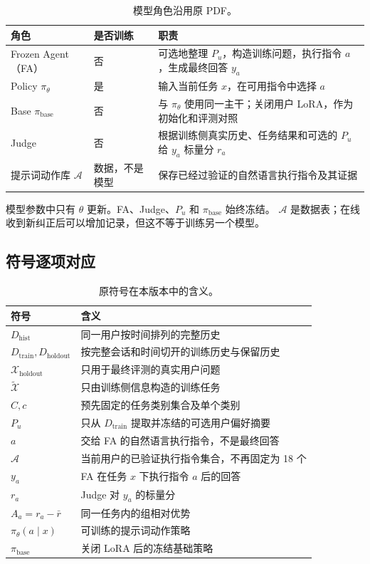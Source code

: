 \documentclass[11pt,UTF8,fontset=fandol]{ctexart}
\newcommand{\Dhist}{D_{\mathrm{hist}}}
\newcommand{\Dtrain}{D_{\mathrm{train}}}
\newcommand{\Dholdout}{D_{\mathrm{holdout}}}
\newcommand{\Xholdout}{\mathcal X_{\mathrm{holdout}}}
\newcommand{\Xsim}{\widetilde{\mathcal X}}
\newcommand{\policy}{\pi_{\theta}}
\newcommand{\basepolicy}{\pi_{\mathrm{base}}}
\begin{document}
\begin{table}[ht]
  \centering
  \caption{模型角色沿用原 PDF。}
  \begin{tabularx}{\textwidth}{@{}L{0.22\textwidth}L{0.14\textwidth}Y@{}}
    \toprule
    角色 & 是否训练 & 职责 \\
    \midrule
    Frozen Agent（FA） &
    否 &
    可选地整理 \(P_u\)，构造训练问题，执行指令 \(a\)，生成最终回答 \(y_a\) \\
    Policy \(\policy\) &
    是 &
    输入当前任务 \(x\)，在可用指令中选择 \(a\) \\
    Base \(\basepolicy\) &
    否 &
    与 \(\policy\) 使用同一主干；关闭用户 LoRA，作为初始化和评测对照 \\
    Judge &
    否 &
    根据训练侧真实历史、任务结果和可选的 \(P_u\) 给 \(y_a\) 标量分 \(r_a\) \\
    提示词动作库 \(\mathcal A\) &
    数据，不是模型 &
    保存已经过验证的自然语言执行指令及其证据 \\
    \bottomrule
  \end{tabularx}
\end{table}

模型参数中只有 \(\theta\) 更新。FA、Judge、\(P_u\) 和 \(\basepolicy\) 始终冻结。
\(\mathcal A\) 是数据表；在线收到新纠正后可以增加记录，但这不等于训练另一个模型。

\subsection{符号逐项对应}

\begin{table}[ht]
  \centering
  \caption{原符号在本版本中的含义。}
  \begin{tabularx}{\textwidth}{@{}L{0.20\textwidth}Y@{}}
    \toprule
    符号 & 含义 \\
    \midrule
    \(\Dhist\) &
    同一用户按时间排列的完整历史 \\
    \(\Dtrain,\Dholdout\) &
    按完整会话和时间切开的训练历史与保留历史 \\
    \(\Xholdout\) &
    只用于最终评测的真实用户问题 \\
    \(\Xsim\) &
    只由训练侧信息构造的训练任务 \\
    \(C,c\) &
    预先固定的任务类别集合及单个类别 \\
    \(P_u\) &
    只从 \(\Dtrain\) 提取并冻结的可选用户偏好摘要 \\
    \(a\) &
    交给 FA 的自然语言执行指令，不是最终回答 \\
    \(\mathcal A\) &
    当前用户的已验证执行指令集合，不再固定为 18 个 \\
    \(y_a\) &
    FA 在任务 \(x\) 下执行指令 \(a\) 后的回答 \\
    \(r_a\) &
    Judge 对 \(y_a\) 的标量分 \\
    \(A_a=r_a-\bar r\) &
    同一任务内的组相对优势 \\
    \(\policy(a\mid x)\) &
    可训练的提示词动作策略 \\
    \(\basepolicy\) &
    关闭 LoRA 后的冻结基础策略 \\
    \bottomrule
  \end{tabularx}
\end{table}
\end{document}
